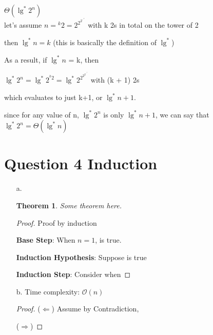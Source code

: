 \documentclass[11pt,fleqn]{article}
\newcommand{\bigO}{\ensuremath{\mathcal{O}}}
\newcommand{\Base}{\textbf{Base Step}: }
\newcommand{\IH}{\textbf{Induction Hypothesis}: }
\newcommand{\IS}{\textbf{Induction Step}: }
\newtheorem*{theorem}{Theorem}
\theoremstyle{definition}
\theoremstyle{remark}
\begin{document}
$\Theta(\lg^*2^n)$\\
let's assume $n = {}^k 2 = 2^{2^{2^{\cdot^{\cdot^{\cdot 2}}}}}$ with k
2s in total on the tower of 2

then $\lg^*n = k$ (this is basically the definition of $\lg^*$)

As a result, if $\lg^*n$ = k, then 

$\lg^*2^n = \lg^*{2^{{}^k 2}} = \lg^*{2^{2^{2^{2^{\cdot^{\cdot^{\cdot 2}}}}}}}$ with (k + 1) 2s

which evaluates to just k+1, or $\lg^*n + 1$.

since for any value of n, $\lg^*{2^n}$ is only $\lg^*n + 1$, we can say
that $\lg^*{2^n} = \Theta(\lg^*{n})$


\newpage
\clearpage

\section{Question 4 Induction}
\begin{enumerate}
    \item[a.]
    \begin{theorem}
        Some theorem here.
    \end{theorem}
    \begin{proof} Proof by induction
    
    \Base {When $n=1$, is true.}
    
    \IH {Suppose is true}
    
    \IS Consider when 
    \end{proof}
    
    \item[b.]
    Time complexity: $\bigO (n)$
    \begin{proof}
    ($\Leftarrow$) Assume by Contradiction,
    
    ($\Rightarrow$)
    \end{proof}
    
\end{enumerate}
\newpage
\clearpage
\end{document}
